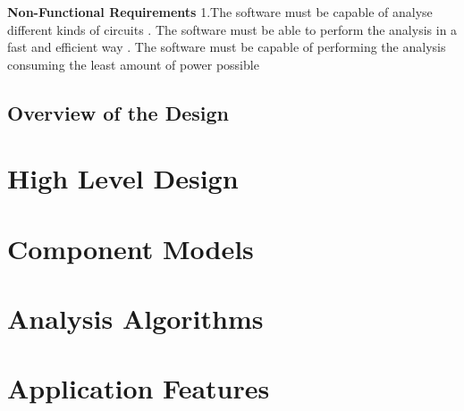 \documentclass{article}
\begin{document}
\bigbreak

\textbf{Non-Functional Requirements}
\newline
1.The software must be capable of analyse different kinds of circuits
. The software must be able to perform the analysis in a fast and efficient way
. The software must be capable of performing the analysis consuming the least amount of power possible

\newpage

\subsection{Overview of the Design}

\section{High Level Design}

\newpage

\section{Component Models}

\newpage

\section{Analysis Algorithms}

\newpage

\section{Application Features}

\newpage
\end{document}
